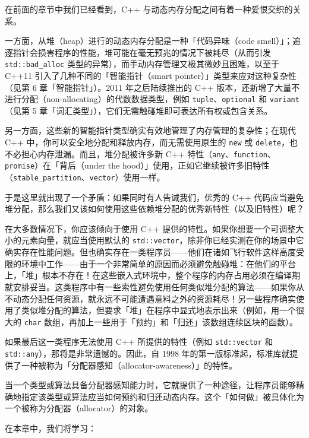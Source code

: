 在前面的章节中我们已经看到，C++ 与动态内存分配之间有着一种爱恨交织的关系。

一方面，从堆（heap）进行的动态内存分配是一种「代码异味（code smell）」；追逐指针会损害程序的性能，堆可能在毫无预兆的情况下被耗尽（从而引发 \texttt{std::\allowbreak{}bad\_\allowbreak{}alloc} 类型的异常），而手动内存管理又极其微妙且困难，以至于 C++11 引入了几种不同的「智能指针（smart pointer）」类型来应对这种复杂性（见第 6 章「智能指针」）。2011 年之后陆续推出的 C++ 版本，还新增了大量不进行分配（non-allocating）的代数数据类型，例如 \texttt{tuple}、\texttt{optional} 和 \texttt{variant}（见第 5 章「词汇类型」），它们无需触碰堆即可表达所有权或包含关系。

另一方面，这些新的智能指针类型确实有效地管理了内存管理的复杂性；在现代 C++ 中，你可以安全地分配和释放内存，而无需使用原生的 \texttt{new} 或 \texttt{delete}，也不必担心内存泄漏。而且，堆分配被许多新 C++ 特性（\texttt{any}、\texttt{function}、\texttt{promise}）在「背后（under the hood）」使用，正如它继续被许多旧特性（\texttt{stable\_\allowbreak{}partition}、\texttt{vector}）使用一样。

于是这里就出现了一个矛盾：如果同时有人告诫我们，优秀的 C++ 代码应当避免堆分配，那么我们又该如何使用这些依赖堆分配的优秀新特性（以及旧特性）呢？

在大多数情况下，你应该倾向于使用 C++ 提供的特性。如果你想要一个可调整大小的元素向量，就应当使用默认的 \texttt{std::\allowbreak{}vector}，除非你已经实测在你的场景中它确实存在性能问题。但也确实存在一类程序员——他们在诸如飞行软件这样高度受限的环境中工作——由于一个非常简单的原因而必须避免触碰堆：在他们的平台上，「堆」根本不存在！在这些嵌入式环境中，整个程序的内存占用必须在编译期就安排妥当。这类程序中有一些索性避免使用任何类似堆分配的算法——如果你从不动态分配任何资源，就永远不可能遭遇意料之外的资源耗尽！另一些程序确实使用了类似堆分配的算法，但要求「堆」在程序中显式地表示出来（例如，用一个很大的 \texttt{char} 数组，再加上一些用于「预约」和「归还」该数组连续区块的函数）。

如果最后这一类程序无法使用 C++ 所提供的特性（例如 \texttt{std::\allowbreak{}vector} 和 \texttt{std::\allowbreak{}any}），那将是非常遗憾的。因此，自 1998 年的第一版标准起，标准库就提供了一种被称为「分配器感知（allocator-awareness）」的特性。

当一个类型或算法具备分配器感知能力时，它就提供了一种途径，让程序员能够精确地指定该类型或算法应当如何预约和归还动态内存。这个「如何做」被具体化为一个被称为分配器（allocator）的对象。

在本章中，我们将学习：

